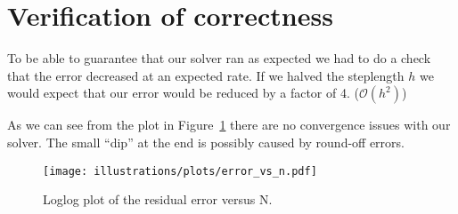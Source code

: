 
\section{Verification of correctness} %
\label{sub:verification_of_correctness}
To be able to guarantee that our solver ran as expected we had to do a check that the error decreased at an expected rate. If we halved the steplength $h$ we would expect that our error would be reduced by a factor of 4. ($\mathcal{O}(h^2)$)

As we can see from the plot in Figure~\ref{fig:error} there are no convergence issues with our solver. The small ``dip'' at the end is possibly caused by round-off errors.

\begin{figure}[htbp]
  \centering
  \texttt{[image: illustrations/plots/error\_vs\_n.pdf]}
  \caption{Loglog plot of the residual error versus N.}
  \label{fig:error}
\end{figure}



